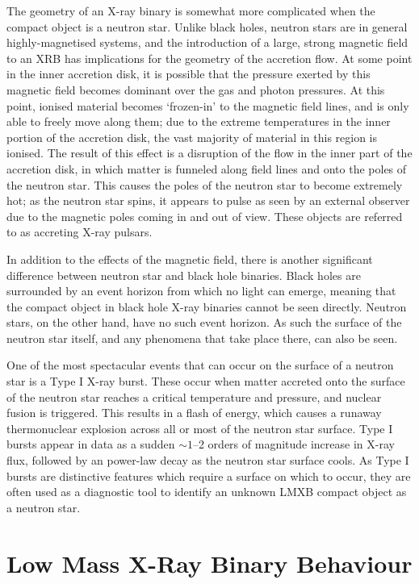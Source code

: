 \par The geometry of an X-ray binary is somewhat more complicated when the compact object is a neutron star.  Unlike black holes, neutron stars are in general highly-magnetised systems, and the introduction of a large, strong magnetic field to an XRB has implications for the geometry of the accretion flow.  At some point in the inner accretion disk, it is possible that the pressure exerted by this magnetic field becomes dominant over the gas and photon pressures.  At this point, ionised material becomes `frozen-in' to the magnetic field lines, and is only able to freely move along them; due to the extreme temperatures in the inner portion of the accretion disk, the vast majority of material in this region is ionised.  The result of this effect is a disruption of the flow in the inner part of the accretion disk, in which matter is funneled along field lines and onto the poles of the neutron star.  This causes the poles of the neutron star to become extremely hot; as the neutron star spins, it appears to pulse as seen by an external observer due to the magnetic poles coming in and out of view.  These objects are referred to as accreting X-ray pulsars.
\par In addition to the effects of the magnetic field, there is another significant difference between neutron star and black hole binaries.  Black holes are surrounded by an event horizon from which no light can emerge, meaning that the compact object in black hole X-ray binaries cannot be seen directly.  Neutron stars, on the other hand, have no such event horizon.  As such the surface of the neutron star itself, and any phenomena that take place there, can also be seen.
\par One of the most spectacular events that can occur on the surface of a neutron star is a Type I X-ray burst.  These occur when matter accreted onto the surface of the neutron star reaches a critical temperature and pressure, and nuclear fusion is triggered.  This results in a flash of energy, which causes a runaway thermonuclear explosion across all or most of the neutron star surface.  Type I bursts appear in data as a sudden $\sim1$--2 orders of magnitude increase in X-ray flux, followed by an power-law decay as the neutron star surface cools.  As Type I bursts are distinctive features which require a surface on which to occur, they are often used as a diagnostic tool to identify an unknown LMXB compact object as a neutron star.

\section{Low Mass X-Ray Binary Behaviour}

